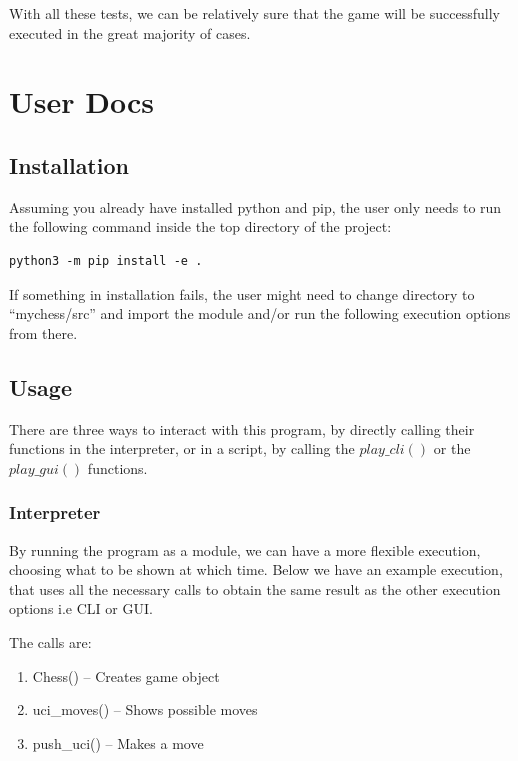 \documentclass[10pt]{article}
\begin{document}
With all these tests, we can be relatively sure that the game will be successfully
executed in the great majority of cases.



\section{User Docs}

\subsection{Installation}

Assuming you already have installed python and pip, the user only needs to run
the following command inside the top directory of the project:
\begin{lstlisting}
python3 -m pip install -e .
\end{lstlisting}

If something in installation fails, the user might need to change directory to
``mychess/src'' and import the module and/or run the following execution options
from there.

\subsection{Usage}

There are three ways to interact with this program, by directly calling their
functions in the interpreter, or in a script, by calling the $play\_cli()$ or the
$play\_gui()$ functions. 

\subsubsection{Interpreter}

By running the program as a module, we can have a more flexible execution,
choosing what to be shown at which time. Below we have an example execution,
that uses all the necessary calls to obtain the same result as the other
execution options i.e CLI or GUI.

The calls are:

\begin{enumerate}[label=\arabic*)]
\item Chess() -- Creates game object
\item uci\_moves() -- Shows possible moves
\item push\_uci() -- Makes a move
\end{enumerate}
\end{document}
